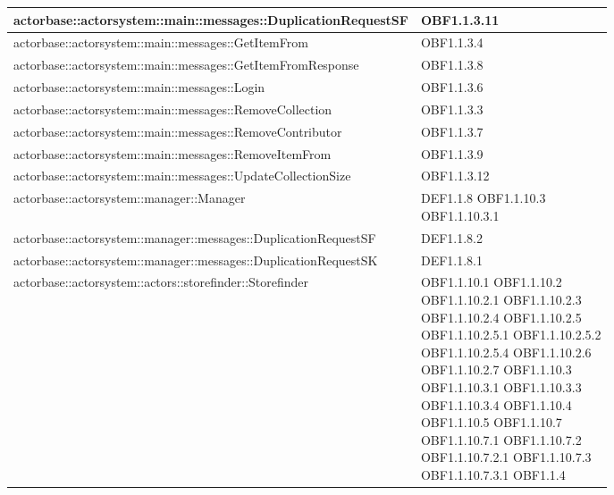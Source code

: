 \documentclass{scalatekids-article}
\begin{document}
\begin{longtable}[H]{|p{12cm}|p{5.5cm}|}
  \hline
  actorbase::actorsystem::main::messages::DuplicationRequestSF & \multiLineCell[t]{OBF1.1.3.11\\}\\
  \hline
  actorbase::actorsystem::main::messages::GetItemFrom & \multiLineCell[t]{OBF1.1.3.4\\}\\
  \hline
  actorbase::actorsystem::main::messages::GetItemFromResponse & \multiLineCell[t]{OBF1.1.3.8\\}\\
  \hline
  actorbase::actorsystem::main::messages::Login & \multiLineCell[t]{OBF1.1.3.6\\}\\
  \hline
  actorbase::actorsystem::main::messages::RemoveCollection & \multiLineCell[t]{OBF1.1.3.3\\}\\
  \hline
  actorbase::actorsystem::main::messages::RemoveContributor & \multiLineCell[t]{OBF1.1.3.7\\}\\
  \hline
  actorbase::actorsystem::main::messages::RemoveItemFrom & \multiLineCell[t]{OBF1.1.3.9\\}\\
  \hline
  actorbase::actorsystem::main::messages::UpdateCollectionSize & \multiLineCell[t]{OBF1.1.3.12\\}\\
  \hline
  actorbase::actorsystem::manager::Manager & \multiLineCell[t]{DEF1.1.8 OBF1.1.10.3\\OBF1.1.10.3.1}\\
  \hline
  actorbase::actorsystem::manager::messages::DuplicationRequestSF & \multiLineCell[t]{DEF1.1.8.2\\}\\
  \hline
  actorbase::actorsystem::manager::messages::DuplicationRequestSK & \multiLineCell[t]{DEF1.1.8.1\\}\\
  \hline
  actorbase::actorsystem::actors::storefinder::Storefinder & \multiLineCell[t]{OBF1.1.10.1 OBF1.1.10.2\\OBF1.1.10.2.1 OBF1.1.10.2.3\\OBF1.1.10.2.4 OBF1.1.10.2.5\\OBF1.1.10.2.5.1 OBF1.1.10.2.5.2\\OBF1.1.10.2.5.4 OBF1.1.10.2.6\\OBF1.1.10.2.7 OBF1.1.10.3\\OBF1.1.10.3.1 OBF1.1.10.3.3\\OBF1.1.10.3.4 OBF1.1.10.4\\OBF1.1.10.5 OBF1.1.10.7\\OBF1.1.10.7.1 OBF1.1.10.7.2\\OBF1.1.10.7.2.1 OBF1.1.10.7.3\\OBF1.1.10.7.3.1 OBF1.1.4\\}\\

\end{longtable}
\end{document}
